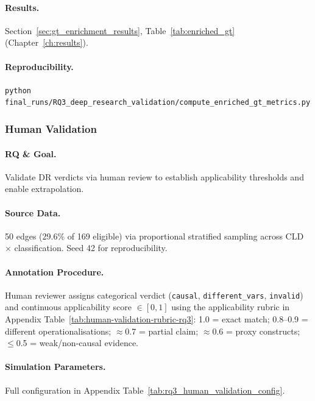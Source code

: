\paragraph{Results.}
Section~\ref{sec:gt_enrichment_results}, Table~\ref{tab:enriched_gt} (Chapter~\ref{ch:results}).

\paragraph{Reproducibility.}
\texttt{python final\_runs/RQ3\_deep\_research\_validation/compute\_enriched\_gt\_metrics.py}

\subsubsection{Human Validation}
\label{sec:rq3_human_validation}

\paragraph{RQ \& Goal.}
Validate DR verdicts via human review to establish applicability thresholds and enable extrapolation.

\paragraph{Source Data.}
50 edges (29.6\% of 169 eligible) via proportional stratified sampling across CLD $\times$ classification. Seed 42 for reproducibility.

\paragraph{Annotation Procedure.}
Human reviewer assigns categorical verdict (\texttt{causal}, \texttt{different\_vars}, \texttt{invalid}) and continuous applicability score $\in[0,1]$ using the applicability rubric in Appendix Table~\ref{tab:human-validation-rubric-rq3}: 1.0 = exact match; 0.8--0.9 = different operationalisations; $\approx$0.7 = partial claim; $\approx$0.6 = proxy constructs; $\leq$0.5 = weak/non-causal evidence.

\paragraph{Simulation Parameters.}
Full configuration in Appendix Table~\ref{tab:rq3_human_validation_config}.

